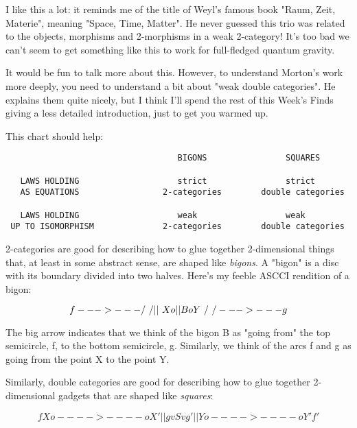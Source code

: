 I like this a lot: it reminds me of the title of Weyl's famous
book "Raum, Zeit, Materie", meaning "Space, Time, Matter".  
He never guessed this trio was related to the objects, morphisms and
2-morphisms in a weak 2-category!  It's too bad we can't seem to
get something like this to work for full-fledged quantum gravity.

It would be fun to talk more about this.  However, to understand Morton's 
work more deeply, you need to understand a bit about "weak double 
categories".  He explains them quite nicely, but I think I'll spend 
the rest of this Week's Finds giving a less detailed introduction, just
to get you warmed up.

This chart should help:

\begin{verbatim}
                                   BIGONS                SQUARES

   LAWS HOLDING                    strict                strict 
   AS EQUATIONS                 2-categories        double categories

   LAWS HOLDING                    weak                  weak
 UP TO ISOMORPHISM              2-categories        double categories
\end{verbatim}
    

2-categories are good for describing how to glue together
2-dimensional things that, at least in some abstract sense, are shaped
like \emph{bigons}.  A "bigon" is a disc with its boundary
divided into two halves.  Here's my feeble ASCCI rendition of a bigon:

$$
                      f 
                   --->---
                  /       \
                 /   ||    \
              X o    ||B    o Y
                 \   \/    /
                  \       /
                   --->---
                      g
                     
$$
    
The big arrow indicates that we think of the bigon B as "going from" 
the top semicircle, f, to the bottom semicircle, g.  Similarly, we 
think of the arcs f and g as going from the point X to the point Y.  

Similarly, double categories are good for describing how to glue together 
2-dimensional gadgets that are shaped like \emph{squares}:

$$
                      f
               X o---->----o X'
                 |         |
               g v    S    v g'
                 |         |
               Y o---->----o Y' 
                      f'
$$
    

